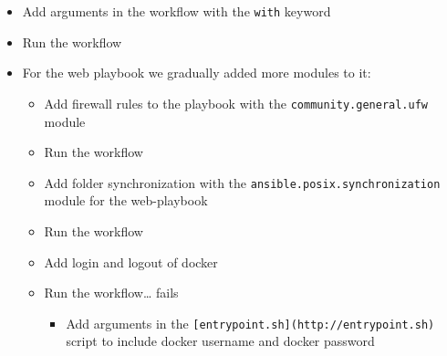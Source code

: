 \begin{itemize}

    \item Add arguments in the workflow with the \texttt{with} keyword
    \item Run the workflow
    \item For the web playbook we gradually added more modules to it:

    \begin{itemize}
        \item Add firewall rules to the playbook with the \texttt{community.general.ufw} module
        \item Run the workflow
        \item Add folder synchronization with the \texttt{ansible.posix.synchronization} module for the web-playbook
        \item Run the workflow
        \item Add login and logout of docker
        \item Run the workflow\ldots{} fails

        \begin{itemize}
            \item Add arguments in the \texttt{{[}entrypoint.sh{]}(http://entrypoint.sh)} script to include docker username and docker password
        \end{itemize}


\end{itemize}
\end{itemize}

